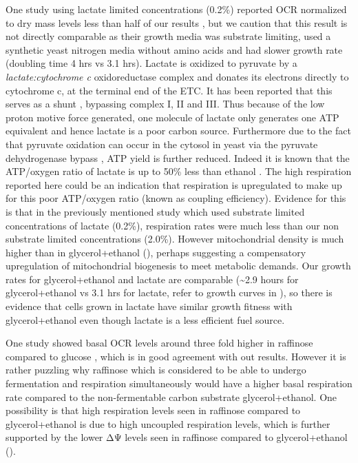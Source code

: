 One study using lactate limited concentrations (0.2\%) reported OCR normalized to dry mass levels less than half of our results \cite{dejean_growth_2000}, but we caution that this result is not directly comparable as their growth media was substrate limiting, used a synthetic yeast nitrogen media without amino acids and had slower growth rate (doubling time 4 hrs vs 3.1 hrs). Lactate is oxidized to pyruvate by a \emph{lactate:cytochrome c} oxidoreductase complex and donates its electrons directly to cytochrome c, at the terminal end of the ETC. It has been reported that this serves as a shunt \cite{pajot_utilization_1974}, bypassing complex I, II and III. Thus because of the low proton motive force generated, one molecule of lactate only generates one ATP equivalent and hence lactate is a poor carbon source. Furthermore due to the fact that pyruvate oxidation can occur in the cytosol in yeast via the pyruvate dehydrogenase bypass \cite{boubekeur_mitochondrial_1999}, ATP yield is further reduced. Indeed it is known that the ATP/oxygen ratio of lactate is up to 50\% less than ethanol \cite{ohnishi_preparation_1966}. The high respiration reported here could be an indication that respiration is upregulated to make up for this poor ATP/oxygen ratio (known as coupling efficiency). Evidence for this is that in the previously mentioned study which used substrate limited concentrations of lactate (0.2\%), respiration rates were much less than our non substrate limited concentrations (2.0\%). However mitochondrial density is much higher than in glycerol+ethanol (), perhaps suggesting a compensatory upregulation of mitochondrial biogenesis to meet metabolic demands. Our growth rates for glycerol+ethanol and lactate are comparable (\textasciitilde2.9 hours for glycerol+ethanol vs 3.1 hrs for lactate, refer to growth curves in ), so there is evidence that cells grown in lactate have similar growth fitness with glycerol+ethanol even though lactate is a less efficient fuel source.

One study showed basal OCR levels around three fold higher in raffinose compared to glucose \cite{guaragnella_yeast_2013}, which is in good agreement with out results. However it is rather puzzling why raffinose which is considered to be able to undergo fermentation and respiration simultaneously would have a higher basal respiration rate compared to the non-fermentable carbon substrate glycerol+ethanol. One possibility is that high respiration levels seen in raffinose compared to glycerol+ethanol is due to high uncoupled respiration levels, which is further supported by the lower ΔΨ levels seen in raffinose compared to glycerol+ethanol ().

